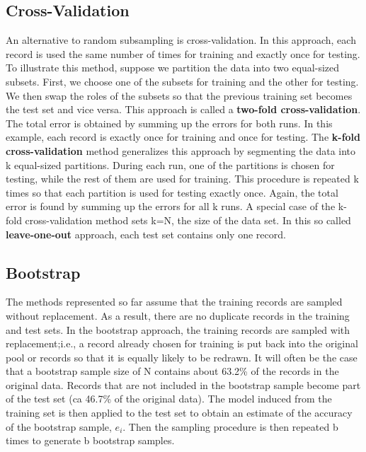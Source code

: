 		\subsection*{Cross-Validation}
		An alternative to random subsampling is cross-validation. In this approach, 
		each record is used the same number of times for training and exactly once 
		for testing. To illustrate this method, suppose we partition the data into
		two equal-sized subsets. First, we choose one of the subsets for training 
		and the other for testing. We then swap the roles of the subsets so that
		the previous training set becomes the test set and vice versa. This approach
		is called a {\bf two-fold cross-validation}. The total error is obtained by summing
		up the errors for both runs. In this example, each record is exactly once 
		for training and once for testing. The {\bf k-fold cross-validation} method
		generalizes this approach by segmenting the data into k equal-sized partitions.
		During each run, one of the partitions is chosen for testing, while the rest
		of them are used for training. This procedure is repeated k times so that
		each partition is used for testing exactly once. Again, the total error is
		found by summing up the errors for all k runs. 
		A special case of the k-fold cross-validation method sets k=N, the size of 
		the data set. In this so called {\bf leave-one-out} approach, each test set 
		contains only one record. 

		\subsection*{Bootstrap}
		The methods represented so far assume that the training records are sampled
		without replacement. As a result, there are no duplicate records in the training
		and test sets. In the bootstrap approach, the training records are sampled 
		with replacement;i.e., a record already chosen for training is put back into
		the original pool or records so that it is equally likely to be redrawn. 
		It will often be the case that a bootstrap  sample size of N contains 
		about 63.2\% of the records in the original data. 
		Records that are not included in the bootstrap sample become part of the
		test set (ca 46.7\% of the original data).
		The model induced from the training set is then applied to the test set
		to obtain an estimate of the accuracy of the bootstrap sample, $e_{i}$.
		Then the sampling procedure is then repeated b times to generate b bootstrap
		samples. 
